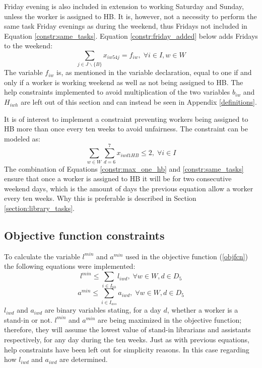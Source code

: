 Friday evening is also included in extension to working Saturday and Sunday, unless the worker is assigned to HB. It is, however, not a necessity to perform the same task Friday evenings as during the weekend, thus Fridays not included in Equation \ref{constr:same_tasks}. Equation \ref{constr:friday_added} below adds Fridays to the weekend:
\begin{equation} \label{constr:friday_added}
\sum_{j \in J \backslash \{B\}}x_{iw54j} = f_{iw}, \; \forall i \in I, w \in W
\end{equation}
The variable $f_{iw}$ is, as mentioned in the variable declaration, equal to one if and only if a worker is working weekend as well as not being assigned to HB. The help constraints implemented to avoid multiplication of the two variables $b_{iw}$ and $H_{iwh}$ are left out of this section and can instead be seen in Appendix \ref{definitions}.

It is of interest to implement a constraint preventing workers being assigned to HB more than once every ten weeks to avoid unfairness. The constraint can be modeled as:
\begin{equation} \label{constr:max_one_hb}
\sum_{w \in W}\sum_{d = 6}^{7}x_{iwd1HB} \leq 2, \; \forall i \in I
\end{equation}
The combination of Equations \ref{constr:max_one_hb} and \ref{constr:same_tasks} ensure that once a worker is assigned to HB it will be for two consecutive weekend days, which is the amount of days the previous equation allow a worker every ten weeks. Why this is preferable is described in Section \ref{section:library_tasks}.

\subsection{Objective function constraints} \label{section:obj_fcn_constraints}
To calculate the variable $l^{min}$ and $a^{min}$ used in the objective function (\ref{objfcn}) the following equations were implemented:
\begin{equation} \label{constr:l_min}
l^{min} \leq \sum_{i \in I_{lib}} l_{iwd}, \; \forall w \in W, d \in D_5
\end{equation}
\begin{equation} \label{constr:a_min}
a^{min} \leq \sum_{i \in I_{ass}} a_{iwd}, \; \forall w \in W, d \in D_5
\end{equation}
$l_{iwd}$ and $a_{iwd}$ are binary variables stating, for a day $d$, whether a worker is a stand-in or not. $l^{min}$ and $a^{min}$ are being maximized in the objective function; therefore, they will assume the lowest value of stand-in librarians and assistants respectively, for any day during the ten weeks. Just as with previous equations, help constraints have been left out for simplicity reasons. In this case regarding how $l_{iwd}$ and $a_{iwd}$ are determined.


